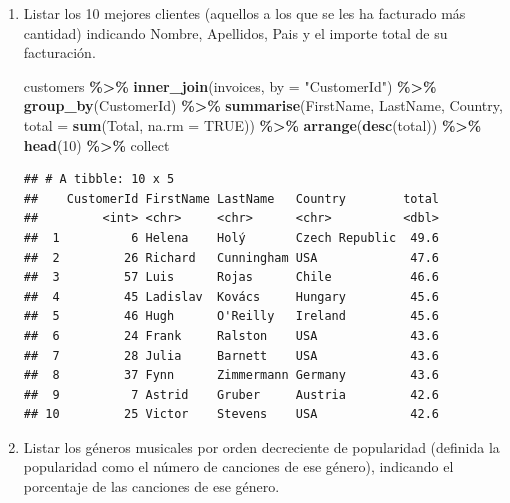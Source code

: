 \documentclass[
]{book}
\newenvironment{Shaded}{\begin{snugshade}}{\end{snugshade}}
\newcommand{\AttributeTok}[1]{\textcolor[rgb]{0.13,0.29,0.53}{#1}}
\newcommand{\ConstantTok}[1]{\textcolor[rgb]{0.56,0.35,0.01}{#1}}
\newcommand{\DecValTok}[1]{\textcolor[rgb]{0.00,0.00,0.81}{#1}}
\newcommand{\FunctionTok}[1]{\textcolor[rgb]{0.13,0.29,0.53}{\textbf{#1}}}
\newcommand{\NormalTok}[1]{#1}
\newcommand{\SpecialCharTok}[1]{\textcolor[rgb]{0.81,0.36,0.00}{\textbf{#1}}}
\newcommand{\StringTok}[1]{\textcolor[rgb]{0.31,0.60,0.02}{#1}}
\theoremstyle{break}
\theoremstyle{nonumberplain}
\begin{document}
\begin{enumerate}
\def\labelenumi{\arabic{enumi}.}
\setcounter{enumi}{5}
\item
  Listar los 10 mejores clientes (aquellos a los que se les ha facturado más cantidad)
  indicando Nombre, Apellidos, Pais y el importe total de su facturación.

\begin{Shaded}
\begin{Highlighting}[]
\NormalTok{customers }\SpecialCharTok{\%\textgreater{}\%} \FunctionTok{inner\_join}\NormalTok{(invoices, }\AttributeTok{by =} \StringTok{"CustomerId"}\NormalTok{) }\SpecialCharTok{\%\textgreater{}\%} \FunctionTok{group\_by}\NormalTok{(CustomerId) }\SpecialCharTok{\%\textgreater{}\%} 
    \FunctionTok{summarise}\NormalTok{(FirstName, LastName, Country, }\AttributeTok{total =} \FunctionTok{sum}\NormalTok{(Total, }\AttributeTok{na.rm =} \ConstantTok{TRUE}\NormalTok{)) }\SpecialCharTok{\%\textgreater{}\%}  
    \FunctionTok{arrange}\NormalTok{(}\FunctionTok{desc}\NormalTok{(total)) }\SpecialCharTok{\%\textgreater{}\%} \FunctionTok{head}\NormalTok{(}\DecValTok{10}\NormalTok{) }\SpecialCharTok{\%\textgreater{}\%}\NormalTok{ collect}
\end{Highlighting}
\end{Shaded}

\begin{verbatim}
## # A tibble: 10 x 5
##    CustomerId FirstName LastName   Country        total
##         <int> <chr>     <chr>      <chr>          <dbl>
##  1          6 Helena    Holý       Czech Republic  49.6
##  2         26 Richard   Cunningham USA             47.6
##  3         57 Luis      Rojas      Chile           46.6
##  4         45 Ladislav  Kovács     Hungary         45.6
##  5         46 Hugh      O'Reilly   Ireland         45.6
##  6         24 Frank     Ralston    USA             43.6
##  7         28 Julia     Barnett    USA             43.6
##  8         37 Fynn      Zimmermann Germany         43.6
##  9          7 Astrid    Gruber     Austria         42.6
## 10         25 Victor    Stevens    USA             42.6
\end{verbatim}
\item
  Listar los géneros musicales por orden decreciente de popularidad
  (definida la popularidad como el número de canciones de ese género),
  indicando el porcentaje de las canciones de ese género.


\end{enumerate}
\end{document}
